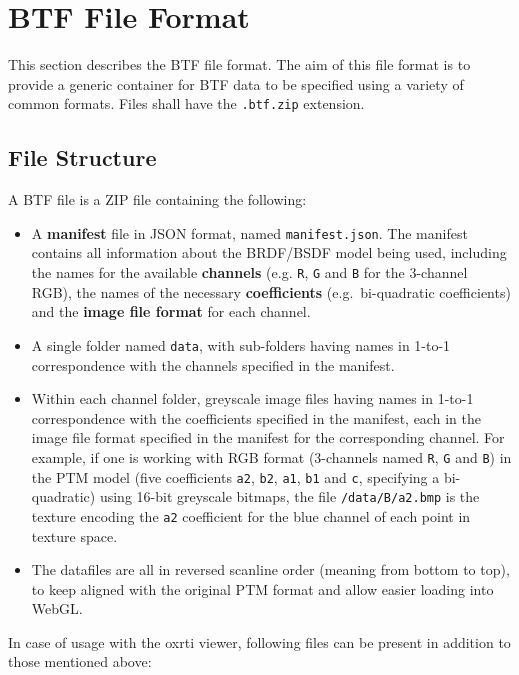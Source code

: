 \hypertarget{btf-file-format}{%
\section{BTF File Format}\label{sec_btf-file-format}}

This section describes the BTF file format. The aim of this file format
is to provide a generic container for BTF data to be specified using a
variety of common formats. Files shall have the \texttt{.btf.zip}
extension.

\hypertarget{file-structure}{%
\subsection{File Structure}\label{file-structure}}

A BTF file is a ZIP file containing the following:
\begin{itemize}
\item A \textbf{manifest}
file in JSON format, named \texttt{manifest.json}. The manifest contains
all information about the BRDF/BSDF model being used, including the
names for the available \textbf{channels} (e.g. \texttt{R}, \texttt{G}
and \texttt{B} for the 3-channel RGB), the names of the necessary
\textbf{coefficients} (e.g.~bi-quadratic coefficients) and the
\textbf{image file format} for each channel.
\item A single folder named
\texttt{data}, with sub-folders having names in 1-to-1 correspondence
with the channels specified in the manifest.
\item Within each channel
folder, greyscale image files having names in 1-to-1 correspondence with
the coefficients specified in the manifest, each in the image file
format specified in the manifest for the corresponding channel. For
example, if one is working with RGB format (3-channels named \texttt{R},
\texttt{G} and \texttt{B}) in the PTM model (five coefficients
\texttt{a2}, \texttt{b2}, \texttt{a1}, \texttt{b1} and \texttt{c},\!
specifying a bi-quadratic) using 16-bit greyscale bitmaps, the file
\texttt{/data/B/a2.bmp} is the texture encoding the \texttt{a2}
coefficient for the blue channel of each point in texture space.
\item The
datafiles are all in reversed scanline order (meaning from bottom to
top), to keep aligned with the original PTM format and allow easier
loading into WebGL.
\end{itemize}

In case of usage with the oxrti viewer, following files can be present in
addition to those mentioned above:

